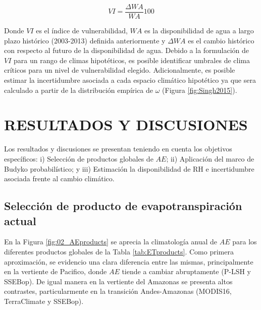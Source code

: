 \documentclass[12pt]{article}
\begin{document}
\begin{equation}
VI = \frac{\Delta WA}{WA}100
\end{equation}

Donde $VI$ es el índice de vulnerabilidad, $WA$ es la disponibilidad de agua a largo plazo histórico (2003-2013) definida anteriormente y $\Delta WA$ es el cambio histórico con respecto al futuro de la disponibilidad de agua. Debido a la formulación de $VI$ para un rango de climas hipotéticos, es posible identificar umbrales de clima críticos para un nivel de vulnerabilidad elegido. Adicionalmente, es posible estimar la incertidumbre asociada a cada espacio climático hipotético ya que sera calculado a partir de la distribución empírica de $\omega$ (Figura \ref{fig:Singh2015}).

\clearpage
\vspace*{0.5mm}
\section{RESULTADOS Y DISCUSIONES}

Los resultados y discusiones se presentan teniendo en cuenta los objetivos específicos: i) Selección de productos globales de $AE$; ii) Aplicación del marco de Budyko probabilístico; y iii) Estimación la disponibilidad de RH e incertidumbre asociada frente al cambio climático.

\subsection{Selección de producto de evapotranspiración actual}

En la Figura \ref{fig:02_AEproducts} se aprecia la climatología anual de $AE$ para los diferentes productos globales de la Tabla \ref{tab:ETproducts}. Como primera aproximación, se evidencio una clara diferencia entre las mismas, principalmente en la vertiente de Pacifico, donde $AE$ tiende a cambiar abruptamente (P-LSH y SSEBop). De igual manera en la vertiente del Amazonas se presenta altos contrastes, particularmente en la transición Andes-Amazonas (MODIS16, TerraClimate y SSEBop). 


\end{document}
